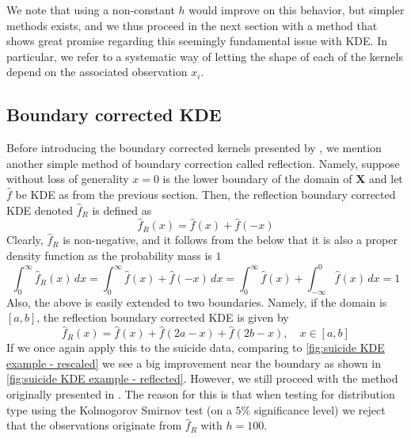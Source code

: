 \documentclass[../Thesis.tex]{subfiles}
\begin{document}
We note that using a non-constant $h$ would improve on this behavior, but simpler methods exists, and we thus proceed in the next section with a method that shows great promise regarding this seemingly fundamental issue with KDE. In particular, we refer to a systematic way of letting the shape of each of the kernels depend on the associated observation $x_i$.


\newpage
\subsection{Boundary corrected KDE}\label{sec:Boundary corrected KDE}
Before introducing the boundary corrected kernels presented by \cite{Jones1993SimpleBC}, we mention another simple method of boundary correction called reflection. Namely, suppose without loss of generality $x = 0$ is the lower boundary of the domain of $\boldsymbol X$ and let $\hat{f}$ be KDE as from the previous section. Then, the reflection boundary corrected KDE denoted $\hat{f}_R$ is defined as
$$\hat{f}_R(x) = \hat{f}(x) + \hat{f}(-x)$$
Clearly, $\hat{f}_R$ is non-negative, and it follows from the below that it is also a proper density function as the probability mass is $1$
$$\int_{0}^{\infty} \hat{f}_R \left(x\right) \, dx = \int_{0}^{\infty} \hat{f} \left(x\right) + \hat{f} \left(-x\right) \, dx = \int_{0}^{\infty} \hat{f} \left(x\right) + \int_{-\infty}^{0}\hat{f} \left(x\right) \, dx = 1$$
Also, the above is easily extended to two boundaries. Namely, if the domain is $[a,b]$, the reflection boundary corrected KDE is given by
$$\hat{f}_R\left(x\right) = \hat{f}\left(x\right) + \hat{f}\left(2a-x\right) + \hat{f}\left(2b-x\right),\quad x \in [a,b]$$
If we once again apply this to the suicide data, comparing to \autoref{fig:suicide KDE example - rescaled} we see a big improvement near the boundary as shown in \autoref{fig:suicide KDE example - reflected}. However, we still proceed with the method originally presented in \cite{Jones1993SimpleBC}. The reason for this is that when testing for distribution type using the Kolmogorov Smirnov test (on a $5\%$ significance level) we reject that the observations originate from $\hat{f}_R$ with $h = 100$.
\end{document}
